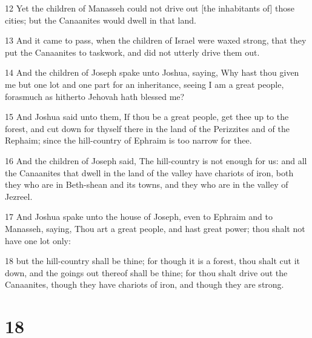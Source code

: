 \par 12 Yet the children of Manasseh could not drive out [the inhabitants of] those cities; but the Canaanites would dwell in that land.
\par 13 And it came to pass, when the children of Israel were waxed strong, that they put the Canaanites to taskwork, and did not utterly drive them out.
\par 14 And the children of Joseph spake unto Joshua, saying, Why hast thou given me but one lot and one part for an inheritance, seeing I am a great people, forasmuch as hitherto Jehovah hath blessed me?
\par 15 And Joshua said unto them, If thou be a great people, get thee up to the forest, and cut down for thyself there in the land of the Perizzites and of the Rephaim; since the hill-country of Ephraim is too narrow for thee.
\par 16 And the children of Joseph said, The hill-country is not enough for us: and all the Canaanites that dwell in the land of the valley have chariots of iron, both they who are in Beth-shean and its towns, and they who are in the valley of Jezreel.
\par 17 And Joshua spake unto the house of Joseph, even to Ephraim and to Manasseh, saying, Thou art a great people, and hast great power; thou shalt not have one lot only:
\par 18 but the hill-country shall be thine; for though it is a forest, thou shalt cut it down, and the goings out thereof shall be thine; for thou shalt drive out the Canaanites, though they have chariots of iron, and though they are strong.

\chapter{18}

